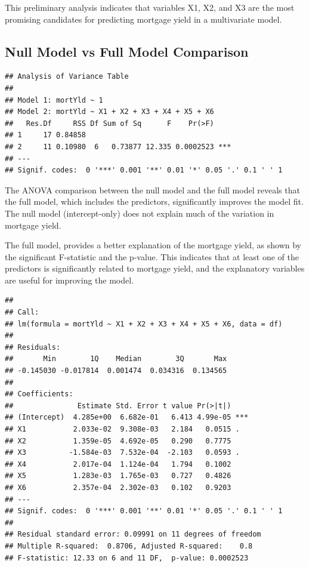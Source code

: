 \documentclass[
  11pt,
]{article}
\begin{document}
This preliminary analysis indicates that variables X1, X2, and X3 are
the most promising candidates for predicting mortgage yield in a
multivariate model.

\subsection{Null Model vs Full Model
Comparison}\label{null-model-vs-full-model-comparison}

\begin{verbatim}
## Analysis of Variance Table
## 
## Model 1: mortYld ~ 1
## Model 2: mortYld ~ X1 + X2 + X3 + X4 + X5 + X6
##   Res.Df     RSS Df Sum of Sq      F    Pr(>F)    
## 1     17 0.84858                                  
## 2     11 0.10980  6   0.73877 12.335 0.0002523 ***
## ---
## Signif. codes:  0 '***' 0.001 '**' 0.01 '*' 0.05 '.' 0.1 ' ' 1
\end{verbatim}

The ANOVA comparison between the null model and the full model reveals
that the full model, which includes the predictors, significantly
improves the model fit. The null model (intercept-only) does not explain
much of the variation in mortgage yield.

The full model, provides a better explanation of the mortgage yield, as
shown by the significant F-statistic and the p-value. This indicates
that at least one of the predictors is significantly related to mortgage
yield, and the explanatory variables are useful for improving the model.

\begin{verbatim}
## 
## Call:
## lm(formula = mortYld ~ X1 + X2 + X3 + X4 + X5 + X6, data = df)
## 
## Residuals:
##       Min        1Q    Median        3Q       Max 
## -0.145030 -0.017814  0.001474  0.034316  0.134565 
## 
## Coefficients:
##               Estimate Std. Error t value Pr(>|t|)    
## (Intercept)  4.285e+00  6.682e-01   6.413 4.99e-05 ***
## X1           2.033e-02  9.308e-03   2.184   0.0515 .  
## X2           1.359e-05  4.692e-05   0.290   0.7775    
## X3          -1.584e-03  7.532e-04  -2.103   0.0593 .  
## X4           2.017e-04  1.124e-04   1.794   0.1002    
## X5           1.283e-03  1.765e-03   0.727   0.4826    
## X6           2.357e-04  2.302e-03   0.102   0.9203    
## ---
## Signif. codes:  0 '***' 0.001 '**' 0.01 '*' 0.05 '.' 0.1 ' ' 1
## 
## Residual standard error: 0.09991 on 11 degrees of freedom
## Multiple R-squared:  0.8706, Adjusted R-squared:    0.8 
## F-statistic: 12.33 on 6 and 11 DF,  p-value: 0.0002523
\end{verbatim}
\end{document}
